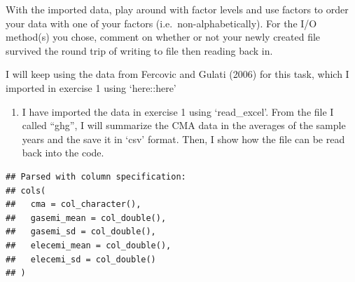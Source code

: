 \documentclass[]{article}
\newenvironment{Shaded}{\begin{snugshade}}{\end{snugshade}}
\newcommand{\DataTypeTok}[1]{\textcolor[rgb]{0.13,0.29,0.53}{#1}}
\newcommand{\KeywordTok}[1]{\textcolor[rgb]{0.13,0.29,0.53}{\textbf{#1}}}
\newcommand{\NormalTok}[1]{#1}
\newcommand{\OperatorTok}[1]{\textcolor[rgb]{0.81,0.36,0.00}{\textbf{#1}}}
\newcommand{\OtherTok}[1]{\textcolor[rgb]{0.56,0.35,0.01}{#1}}
\newcommand{\StringTok}[1]{\textcolor[rgb]{0.31,0.60,0.02}{#1}}
\providecommand{\tightlist}{%
  \setlength{\itemsep}{0pt}\setlength{\parskip}{0pt}}
\begin{document}
With the imported data, play around with factor levels and use factors
to order your data with one of your factors (i.e.~non-alphabetically).
For the I/O method(s) you chose, comment on whether or not your newly
created file survived the round trip of writing to file then reading
back in.

I will keep using the data from Fercovic and Gulati (2006) for this
task, which I imported in exercise 1 using `here::here'

\begin{enumerate}
\def\labelenumi{\arabic{enumi}.}
\tightlist
\item
  I have imported the data in exercise 1 using `read\_excel'. From the
  file I called ``ghg'', I will summarize the CMA data in the averages
  of the sample years and the save it in `csv' format. Then, I show how
  the file can be read back into the code.
\end{enumerate}

\begin{Shaded}
\end{Shaded}

\begin{verbatim}
## Parsed with column specification:
## cols(
##   cma = col_character(),
##   gasemi_mean = col_double(),
##   gasemi_sd = col_double(),
##   elecemi_mean = col_double(),
##   elecemi_sd = col_double()
## )
\end{verbatim}
\end{document}
